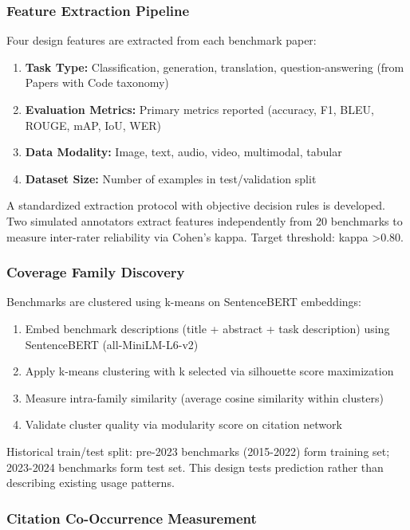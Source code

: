 
\subsubsection{Feature Extraction Pipeline}

Four design features are extracted from each benchmark paper:

\begin{enumerate}
\item \textbf{Task Type:} Classification, generation, translation, question-answering (from Papers with Code taxonomy)
\item \textbf{Evaluation Metrics:} Primary metrics reported (accuracy, F1, BLEU, ROUGE, mAP, IoU, WER)
\item \textbf{Data Modality:} Image, text, audio, video, multimodal, tabular
\item \textbf{Dataset Size:} Number of examples in test/validation split
\end{enumerate}

A standardized extraction protocol with objective decision rules is developed. Two simulated annotators extract features independently from 20 benchmarks to measure inter-rater reliability via Cohen's kappa. Target threshold: kappa >0.80.

\subsubsection{Coverage Family Discovery}

Benchmarks are clustered using k-means on SentenceBERT embeddings:

\begin{enumerate}
\item Embed benchmark descriptions (title + abstract + task description) using SentenceBERT (all-MiniLM-L6-v2)
\item Apply k-means clustering with k selected via silhouette score maximization
\item Measure intra-family similarity (average cosine similarity within clusters)
\item Validate cluster quality via modularity score on citation network
\end{enumerate}

Historical train/test split: pre-2023 benchmarks (2015-2022) form training set; 2023-2024 benchmarks form test set. This design tests prediction rather than describing existing usage patterns.

\subsubsection{Citation Co-Occurrence Measurement}

